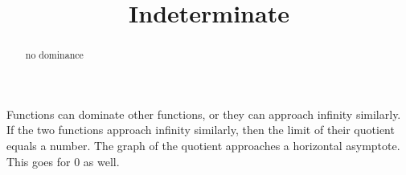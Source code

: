 \documentclass{ximera}
\title{Indeterminate}
\begin{document}
\begin{abstract}
no dominance
\end{abstract}
\maketitle





Functions can dominate other functions, or they can approach infinity similarly.  If the two functions approach infinity similarly, then the limit of their quotient equals a number.  The graph of the quotient approaches a horizontal asymptote. \\

This goes for $0$ as well. \\
\end{document}
